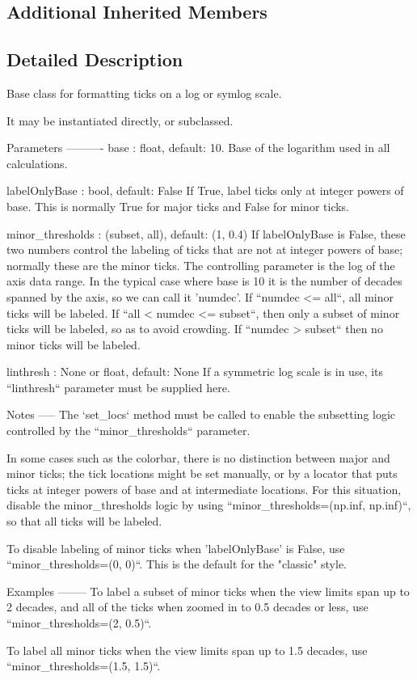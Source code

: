 \subsection*{Additional Inherited Members}


\subsection{Detailed Description}
\begin{DoxyVerb}Base class for formatting ticks on a log or symlog scale.

It may be instantiated directly, or subclassed.

Parameters
----------
base : float, default: 10.
    Base of the logarithm used in all calculations.

labelOnlyBase : bool, default: False
    If True, label ticks only at integer powers of base.
    This is normally True for major ticks and False for
    minor ticks.

minor_thresholds : (subset, all), default: (1, 0.4)
    If labelOnlyBase is False, these two numbers control
    the labeling of ticks that are not at integer powers of
    base; normally these are the minor ticks. The controlling
    parameter is the log of the axis data range.  In the typical
    case where base is 10 it is the number of decades spanned
    by the axis, so we can call it 'numdec'. If ``numdec <= all``,
    all minor ticks will be labeled.  If ``all < numdec <= subset``,
    then only a subset of minor ticks will be labeled, so as to
    avoid crowding. If ``numdec > subset`` then no minor ticks will
    be labeled.

linthresh : None or float, default: None
    If a symmetric log scale is in use, its ``linthresh``
    parameter must be supplied here.

Notes
-----
The `set_locs` method must be called to enable the subsetting
logic controlled by the ``minor_thresholds`` parameter.

In some cases such as the colorbar, there is no distinction between
major and minor ticks; the tick locations might be set manually,
or by a locator that puts ticks at integer powers of base and
at intermediate locations.  For this situation, disable the
minor_thresholds logic by using ``minor_thresholds=(np.inf, np.inf)``,
so that all ticks will be labeled.

To disable labeling of minor ticks when 'labelOnlyBase' is False,
use ``minor_thresholds=(0, 0)``.  This is the default for the
"classic" style.

Examples
--------
To label a subset of minor ticks when the view limits span up
to 2 decades, and all of the ticks when zoomed in to 0.5 decades
or less, use ``minor_thresholds=(2, 0.5)``.

To label all minor ticks when the view limits span up to 1.5
decades, use ``minor_thresholds=(1.5, 1.5)``.
\end{DoxyVerb}
 

